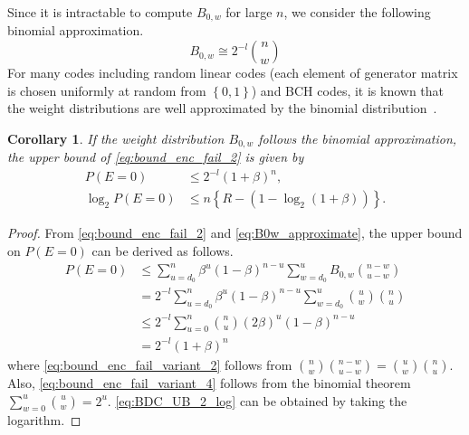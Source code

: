 \documentclass[10pt,twocolumn,twoside,submit]{JCNtran}
\newtheorem{corollary}[theorem]{Corollary}
\begin{document}
	Since it is intractable to compute $B_{0,w}$ for large $n$, we consider the following binomial approximation.
	\begin{equation}\label{eq:B0w_approximate}
		B_{0,w} \cong 2^{-l} \binom{n}{w}
	\end{equation}
	For many codes including random linear codes (each element of generator matrix is chosen uniformly at random from $\left\{0, 1 \right\}$) and BCH codes, it is known that the weight distributions are well approximated by the binomial distribution~\cite{Macwilliams1977theory}. 
	
	\begin{corollary}\label{cor:BDC_UB_2}If the weight distribution $B_{0,w}$ follows the binomial approximation, the upper bound of \eqref{eq:bound_enc_fail_2} is given by
	\begin{align}
		P(E=0) &\le 2^{-l}\left(1 + \beta\right)^n \label{eq:BDC_UB_2}, \\
		\log_2{P(E=0)} &\le n \left\{R - \left(1 - \log_2(1 + \beta) \right) \right\}. \label{eq:BDC_UB_2_log}
	\end{align}
	\end{corollary}
	\begin{proof}
	From \eqref{eq:bound_enc_fail_2} and \eqref{eq:B0w_approximate}, the upper bound on $P\left(E = 0 \right)$ can be derived as follows.
	\begin{align}
	P\left(E=0\right)
	& \le \sum_{u = d_0}^{n}{\beta^u \left(1 - \beta \right)^{n-u}  \sum_{w=d_0}^{u}{B_{0, w} \binom{n-w}{u-w}} } \label{eq:bound_enc_fail_variant_0} \\
	& = 2^{-l} \sum_{u = d_0}^{n}{\beta^u \left(1 - \beta \right)^{n-u} \sum_{w=d_0}^{u}{\binom{u}{w} \binom{n}{u}}} \label{eq:bound_enc_fail_variant_2} \\
	& \le 2^{-l} \sum_{u = 0}^{n}{\binom{n}{u} \left(2\beta\right)^u \left(1 - \beta \right)^{n-u}} \label{eq:bound_enc_fail_variant_4} \\
	& = 2^{-l} \left(1 + \beta \right)^n \label{eq:RA_M}
	\end{align}
	where \eqref{eq:bound_enc_fail_variant_2} follows from $\binom{n}{w} \binom{n-w}{u-w} = \binom{u}{w} \binom{n}{u}$. Also, \eqref{eq:bound_enc_fail_variant_4} follows from the binomial theorem $\sum_{w = 0}^{u}{\binom{u}{w}} = 2^u$.
	\eqref{eq:BDC_UB_2_log} can be obtained by taking the logarithm.
	\end{proof}	
	
\end{document}
